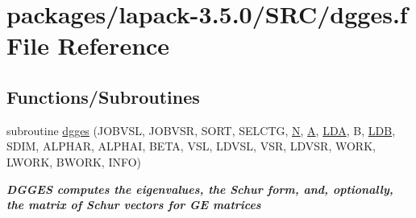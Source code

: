 \hypertarget{dgges_8f}{}\section{packages/lapack-\/3.5.0/\+S\+R\+C/dgges.f File Reference}
\label{dgges_8f}
\subsection*{Functions/\+Subroutines}
\begin{DoxyCompactItemize}
\item 
subroutine \hyperlink{group__doubleGEeigen_ga8637d4b822e19d10327ddcb4235dc08e}{dgges} (J\+O\+B\+V\+S\+L, J\+O\+B\+V\+S\+R, S\+O\+R\+T, S\+E\+L\+C\+T\+G, \hyperlink{polmisc_8c_a0240ac851181b84ac374872dc5434ee4}{N}, \hyperlink{classA}{A}, \hyperlink{example__user_8c_ae946da542ce0db94dced19b2ecefd1aa}{L\+D\+A}, B, \hyperlink{example__user_8c_a50e90a7104df172b5a89a06c47fcca04}{L\+D\+B}, S\+D\+I\+M, A\+L\+P\+H\+A\+R, A\+L\+P\+H\+A\+I, B\+E\+T\+A, V\+S\+L, L\+D\+V\+S\+L, V\+S\+R, L\+D\+V\+S\+R, W\+O\+R\+K, L\+W\+O\+R\+K, B\+W\+O\+R\+K, I\+N\+F\+O)
\begin{DoxyCompactList}\small\item\em {\bfseries  D\+G\+G\+E\+S computes the eigenvalues, the Schur form, and, optionally, the matrix of Schur vectors for G\+E matrices} \end{DoxyCompactList}\end{DoxyCompactItemize}
